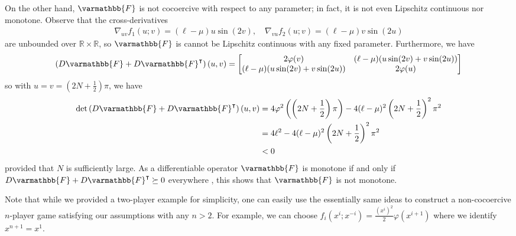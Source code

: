\documentclass{article}
\newcommand{\reals}{\mathbb{R}}
\newcommand{\opF}{{\varmathbb{F}}}
\theoremstyle{plain}
\theoremstyle{remark}
\begin{document}
On the other hand, $\opF$ is not cocoercive with respect to any parameter; in fact, it is not even Lipschitz continuous nor monotone.
Observe that the cross-derivatives
\begin{align*}
    \nabla_{uv} f_1 (u;v) = (\ell-\mu) u \sin (2v), \quad \nabla_{vu} f_2 (u;v) = (\ell-\mu) v \sin (2u)
\end{align*}
are unbounded over $\reals \times \reals$, so $\opF$ is cannot be Lipschitz continuous with any fixed parameter.
Furthermore, we have
\begin{align*}
    \left( D\opF + D\opF^\intercal \right) (u,v) =
    \begin{bmatrix}
        2\varphi(v) & (\ell-\mu) (u \sin (2v) + v \sin (2u)) \\
        (\ell-\mu) (u \sin (2v) + v \sin (2u)) & 2\varphi(u)
    \end{bmatrix}
\end{align*}
so with $u = v = \left(2N + \frac{1}{2}\right)\pi$, we have
\begin{align*}
    \det \left( D\opF + D\opF^\intercal \right) (u,v) & = 
    4 \varphi^2 \left( \left( 2N + \frac{1}{2} \right) \pi \right) - 4(\ell-\mu)^2 \left(2N + \frac{1}{2}\right)^2 \pi^2 \\
    & = 4\ell^2 - 4(\ell-\mu)^2 \left(2N + \frac{1}{2}\right)^2 \pi^2 \\
    & < 0
\end{align*}
provided that $N$ is sufficiently large.
As a differentiable operator $\opF$ is monotone if and only if $D\opF + D\opF^\intercal \succeq 0$ everywhere \citep{ryu2022large}, this shows that $\opF$ is not monotone.

Note that while we provided a two-player example for simplicity, one can easily use the essentially same ideas to construct a non-cocoercive $n$-player game satisfying our assumptions with any $n>2$.
For example, we can choose $f_i(x^i; x^{-i}) = \frac{(x^i)^2}{2} \varphi(x^{i+1})$ where we identify $x^{n+1} = x^1$.
\end{document}
